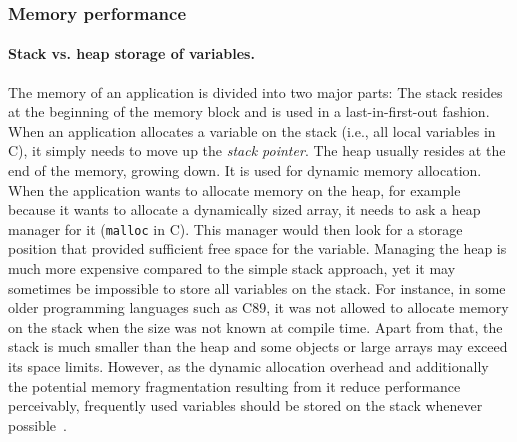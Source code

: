 \subsubsection{Memory performance}
\label{memory_performance}
\paragraph{Stack vs. heap storage of variables.} The memory of an application is divided into two major parts: The stack resides at the beginning of the memory block and is used in a last-in-first-out fashion. When an application allocates a variable on the stack (i.e., all local variables in C), it simply needs to move up the \emph{stack pointer}. The heap usually resides at the end of the memory, growing down. It is used for dynamic memory allocation. When the application wants to allocate memory on the heap, for example because it wants to allocate a dynamically sized array, it needs to ask a heap manager for it (\texttt{malloc} in C). This manager would then look for a storage position that provided sufficient free space for the variable. Managing the heap is much more expensive compared to the simple stack approach, yet it may sometimes be impossible to store all variables on the stack. For instance, in some older programming languages such as C89, it was not allowed to allocate memory on the stack when the size was not known at compile time. Apart from that, the stack is much smaller than the heap and some objects or large arrays may exceed its space limits. However, as the dynamic allocation overhead and additionally the potential memory fragmentation resulting from it reduce performance perceivably, frequently used variables should be stored on the stack whenever possible~\cite[p. 90]{fog2011optimizing}.

